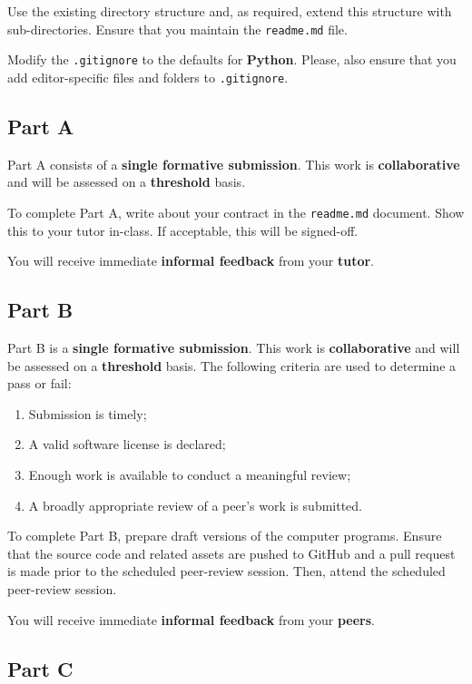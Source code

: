 \documentclass{../../fal_assignment}
\begin{document}
Use the existing directory structure and, as required, extend this structure with sub-directories. Ensure that you maintain the \texttt{readme.md} file.

Modify the \texttt{.gitignore} to the defaults for \textbf{Python}. Please, also ensure that you add editor-specific files and folders to \texttt{.gitignore}. 

\subsection*{Part A}

Part A consists of a \textbf{single formative submission}. This work is \textbf{collaborative} and will be assessed on a \textbf{threshold} basis. 

To complete Part A, write about your contract in the \texttt{readme.md} document.  Show this to your tutor in-class.  If acceptable, this will be signed-off. 

You will receive immediate \textbf{informal feedback} from your \textbf{tutor}.

\subsection*{Part B}

Part B is a \textbf{single formative submission}. This work is \textbf{collaborative} and will be assessed on a \textbf{threshold} basis. The following criteria are used to determine a pass or fail:

\begin{enumerate}[label=(\alph*)]
	\item Submission is timely;
	\item A valid software license is declared;
	\item Enough work is available to conduct a meaningful review;
	\item A broadly appropriate review of a peer's work is submitted.
\end{enumerate}

To complete Part B, prepare draft versions of the computer programs. Ensure that the source code and related assets are pushed to GitHub and a pull request is made prior to the scheduled peer-review session. Then, attend the scheduled peer-review session.

You will receive immediate \textbf{informal feedback} from your \textbf{peers}.

\subsection*{Part C}
\end{document}
